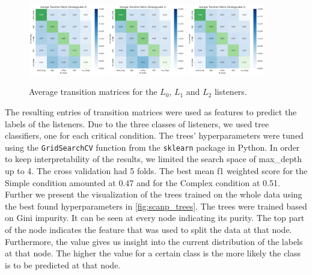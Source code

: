 \begin{figure}
    \centering
    \includegraphics[width=0.3\textwidth]{images/trans_mat_l0.png}
    \includegraphics[width=0.3\textwidth]{images/trans_mat_l1.png}
    \includegraphics[width=0.3\textwidth]{images/trans_mat_l2.png}
    \caption{Average transition matrices for the $L_0$, $L_1$ and $L_2$ listeners.}
    \label{fig:trans_mat}
\end{figure}

The resulting entries of transition matrices were used as features to predict the labels of the listeners. Due to the three classes of listeners, we used tree classifiers, one for each critical condition. The trees' hyperparameters were tuned using the \texttt{GridSearchCV} function from the \texttt{sklearn} package in Python. 
In order to keep interpretability of the results, we limited the search space of max\_depth up to 4. The cross validation had 5 folds. The best mean f1 weighted score for the Simple condition amounted at 0.47 and for the Complex condition at 0.51. Further we present the visualization of the trees trained on the whole data using the best found hyperparameters in \autoref{fig:scanp_trees}. The trees were trained based on Gini impurity. It can be seen at every node indicating its purity. The top part of the node indicates the feature that was used to split the data at that node. Furthermore, the value gives us insight into the current distribution of the labels at that node. The higher the value for a certain class is the more likely the class is to be predicted at that node.

